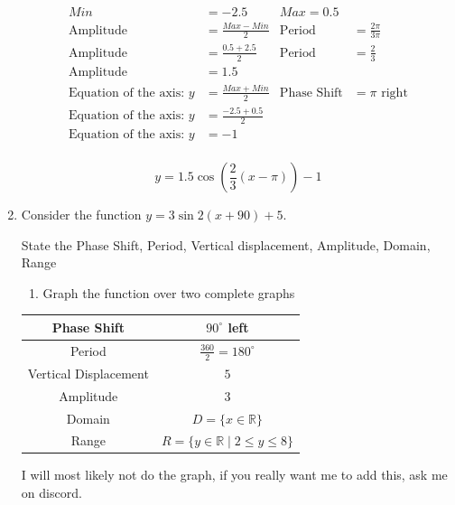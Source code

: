 \documentclass[paper=a4, fontsize=11pt]{scrartcl}
\begin{document}
\begin{enumerate}[resume]
\begin{center}
    \end{center}
    \begin{align*}
    Min&=-2.5&Max=0.5\\
    \text{Amplitude}&=\frac{Max-Min}{2}&\text{Period}&=\frac{2\pi}{3\pi}\\
    \text{Amplitude}&=\frac{0.5+2.5}{2}&\text{Period}&=\frac{2}{3}\\
    \text{Amplitude}&=1.5\\
    \text{Equation of the axis: }y&=\frac{Max+Min}{2}&\text{Phase Shift}&=\pi \text{ right}\\
    \text{Equation of the axis: }y&=\frac{-2.5+0.5}{2}\\
    \text{Equation of the axis: }y&=-1\\
    \end{align*}
    \begin{center}
        $$y=1.5\cos(\frac{2}{3}(x-\pi))-1$$
    \end{center}
    \item Consider the function $y=3\sin 2(x+90)+5$.
    
    State the Phase Shift, Period, Vertical displacement, Amplitude, Domain, Range
    \begin{enumerate}
        \item Graph the function over two complete graphs
    \end{enumerate}
    \begin{center}
        \begin{tabular}{|c|c|}
            \hline
            Phase Shift &$90^\circ$ left\\
            \hline
            Period &$\frac{360}{2}=180^\circ$\\
            \hline
            Vertical Displacement &$5$\\
            \hline
            Amplitude &$3$\\
            \hline
            Domain &$D=\{x\in\mathbb{R}\}$\\
            \hline
            Range &$R=\{y\in\mathbb{R}\mid 2\le y \le 8\}$\\
            \hline
        \end{tabular}
    \end{center}
    I will most likely not do the graph, if you really want me to add this, ask me on discord.


\end{enumerate}
\end{document}
